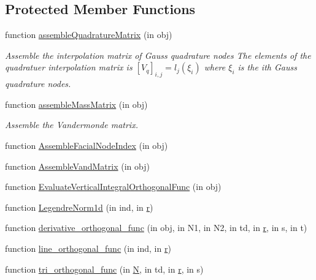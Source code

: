 \subsection*{Protected Member Functions}
\begin{DoxyCompactItemize}
\item 
function \hyperlink{class_std_prism_tri_a5a4e1d1a3bbe1b8aea7ae9d0529c78a3}{assemble\+Quadrature\+Matrix} (in obj)
\begin{DoxyCompactList}\small\item\em Assemble the interpolation matrix of Gauss quadrature nodes The elements of the quadratuer interpolation matrix is $ [V_q]_{i,j} = l_j(\xi_i) $ where $ \xi_i $ is the ith Gauss quadrature nodes. \end{DoxyCompactList}\item 
function \hyperlink{class_std_prism_tri_a788c97ee74f5c3068038cf4d4008fa64}{assemble\+Mass\+Matrix} (in obj)
\begin{DoxyCompactList}\small\item\em Assemble the Vandermonde matrix. \end{DoxyCompactList}\item 
function \hyperlink{class_std_prism_tri_a879d55afa4176ca6174b069b03dd6fce}{Assemble\+Facial\+Node\+Index} (in obj)
\item 
function \hyperlink{class_std_prism_tri_a30ab6b775934cbc81fff59c607e9096a}{Assemble\+Vand\+Matrix} (in obj)
\item 
function \hyperlink{class_std_prism_tri_af0a8de9e52cec135e335848e68c54de2}{Evaluate\+Vertical\+Integral\+Orthogonal\+Func} (in obj)
\item 
function \hyperlink{class_std_prism_tri_a369076123765c2b71c10a098a3ac5e2b}{Legendre\+Norm1d} (in ind, in \hyperlink{class_std_prism_tri_aad8e1b11ac7552139fe6aacc8728b249}{r})
\item 
function \hyperlink{class_std_prism_tri_a2a918b6587e6d53a6d5a2aff056a118c}{derivative\+\_\+orthogonal\+\_\+func} (in obj, in N1, in N2, in td, in \hyperlink{class_std_prism_tri_aad8e1b11ac7552139fe6aacc8728b249}{r}, in s, in t)
\item 
function \hyperlink{class_std_prism_tri_a95c573c90aec2945b9c1c3362c405f6d}{line\+\_\+orthogonal\+\_\+func} (in ind, in \hyperlink{class_std_prism_tri_aad8e1b11ac7552139fe6aacc8728b249}{r})
\item 
function \hyperlink{class_std_prism_tri_a94fd2a92e233dce1c2d3e3a95ab35a7e}{tri\+\_\+orthogonal\+\_\+func} (in \hyperlink{class_std_prism_tri_ae66dea60d79b3eea15b9be2c1892d784}{N}, in td, in \hyperlink{class_std_prism_tri_aad8e1b11ac7552139fe6aacc8728b249}{r}, in s)

\end{DoxyCompactItemize}
